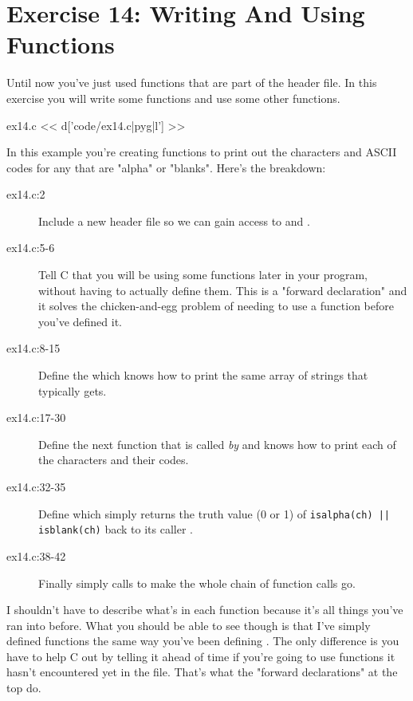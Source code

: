 \chapter{Exercise 14: Writing And Using Functions}

Until now you've just used functions that are part of the
 header file.  In this exercise you will write
some functions and use some other functions.

\begin{code}{ex14.c}
<< d['code/ex14.c|pyg|l'] >>
\end{code}

In this example you're creating functions to print out the
characters and ASCII codes for any that are "alpha" or "blanks".
Here's the breakdown:

\begin{description}
\item[ex14.c:2] Include a new header file so we can gain access to
     and .
\item[ex14.c:5-6] Tell C that you will be using some functions later
    in your program, without having to actually define them.
    This is a "forward declaration" and it solves the chicken-and-egg
    problem of needing to use a function before you've defined it.
\item[ex14.c:8-15] Define the  which knows how
    to print the same array of strings that  typically
    gets.
\item[ex14.c:17-30] Define the next function  that 
    is called \emph{by}  and knows
    how to print each of the characters and their codes.
\item[ex14.c:32-35] Define  which simply returns
    the truth value (0 or 1) of \verb,isalpha(ch) || isblank(ch),
    back to its caller .
\item[ex14.c:38-42] Finally  simply calls 
    to make the whole chain of function calls go.
\end{description}

I shouldn't have to describe what's in each function because it's all
things you've ran into before.  What you should be able to see though
is that I've simply defined functions the same way you've been defining
.  The only difference is you have to help C out by telling
it ahead of time if you're going to use functions it hasn't encountered
yet in the file.  That's what the "forward declarations" at the top do.


